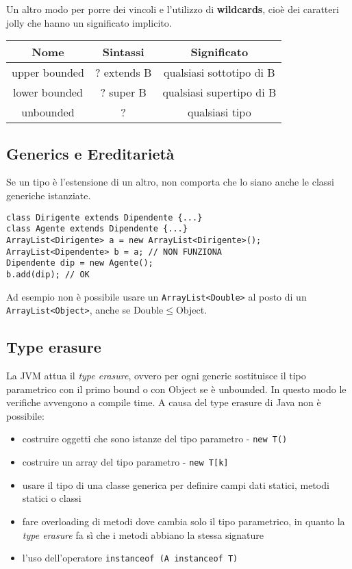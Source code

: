 Un altro modo per porre dei vincoli e l'utilizzo di \textbf{wildcards}, cioè dei caratteri jolly che hanno un significato implicito.

\begin{table}[H]
\centering
\begin{tabular}{|c|c|c|}
\hline
\textbf{Nome} & \textbf{Sintassi} & \textbf{Significato} \\
\hline
upper bounded & ? extends B & qualsiasi sottotipo di B \\
\hline
lower bounded & ? super B & qualsiasi supertipo di B \\
\hline
unbounded & ? & qualsiasi tipo \\
\hline
\end{tabular}
\end{table}

\subsection{Generics e Ereditarietà}
Se un tipo è l'estensione di un altro, non comporta che lo siano anche le classi generiche istanziate. 
\begin{lstlisting}
class Dirigente extends Dipendente {...}
class Agente extends Dipendente {...}
ArrayList<Dirigente> a = new ArrayList<Dirigente>();
ArrayList<Dipendente> b = a; // NON FUNZIONA
Dipendente dip = new Agente();
b.add(dip); // OK
\end{lstlisting}
Ad esempio non è possibile usare un \texttt{ArrayList<Double>} al posto di un \texttt{ArrayList<Object>}, anche se Double$\le$Object.

\subsection{Type erasure}
La JVM attua il \textit{type erasure}, ovvero per ogni generic sostituisce il tipo parametrico con il primo bound o con Object se è unbounded. In questo modo le verifiche avvengono a compile time. A causa del type erasure di Java non è possibile:
\begin{itemize}
\item costruire oggetti che sono istanze del tipo parametro - \texttt{new T()}
\item costruire un array del tipo parametro - \texttt{new T[k]}
\item usare il tipo di una classe generica per definire campi dati statici, metodi statici o classi
\item fare overloading di metodi dove cambia solo il tipo parametrico, in quanto la \textit{type erasure} fa sì che i metodi abbiano la stessa signature
\item l'uso dell’operatore \texttt{instanceof (A instanceof T)}
\end{itemize}

